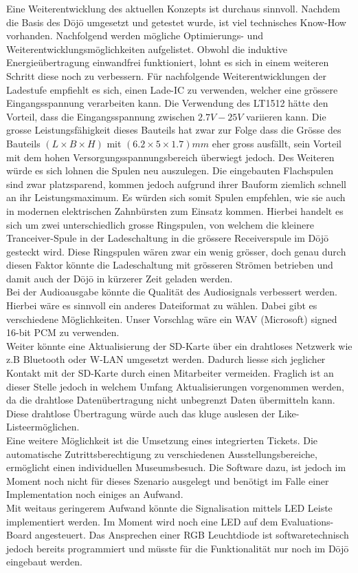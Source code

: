 Eine Weiterentwicklung des aktuellen Konzepts ist durchaus sinnvoll. Nachdem die Basis des Dōjō umgesetzt und getestet wurde, ist viel technisches \glqq Know-How \grqq vorhanden. Nachfolgend werden mögliche Optimierungs- und Weiterentwicklungsmöglichkeiten aufgelistet. 
Obwohl die induktive Energieübertragung einwandfrei funktioniert, lohnt es sich in einem weiteren Schritt diese noch zu verbessern. Für nachfolgende Weiterentwicklungen der Ladestufe empfiehlt es sich, einen Lade-IC zu verwenden, welcher eine grössere Eingangsspannung verarbeiten kann. Die Verwendung des LT1512 hätte den Vorteil, dass die Eingangsspannung zwischen $2.7V - 25V$ variieren kann. Die grosse Leistungsfähigkeit dieses Bauteils hat zwar zur Folge dass die Grösse des Bauteils $(L \times B \times H)$ mit $(6.2\times 5\times 1.7)mm$ eher gross ausfällt, sein Vorteil mit dem hohen Versorgungsspannungsbereich überwiegt jedoch. Des Weiteren würde es sich lohnen die Spulen neu auszulegen. Die eingebauten Flachspulen sind zwar platzsparend, kommen jedoch aufgrund ihrer Bauform ziemlich schnell an ihr Leistungsmaximum. Es würden sich somit Spulen empfehlen, wie sie auch in modernen elektrischen Zahnbürsten zum Einsatz kommen. Hierbei handelt es sich um zwei unterschiedlich grosse Ringspulen, von welchem die kleinere Tranceiver-Spule in der Ladeschaltung in die grössere Receiverspule im Dōjō gesteckt wird. Diese Ringspulen wären zwar ein wenig grösser, doch genau durch diesen Faktor könnte die Ladeschaltung mit grösseren Strömen betrieben und damit auch der Dōjō in kürzerer Zeit geladen werden.\\
Bei der Audioausgabe könnte die Qualität des Audiosignals verbessert werden. Hierbei wäre es sinnvoll ein anderes Dateiformat zu wählen. Dabei gibt es verschiedene Möglichkeiten. Unser Vorschlag wäre ein WAV (Microsoft) signed 16-bit PCM zu verwenden.\\
Weiter könnte eine Aktualisierung der SD-Karte über ein drahtloses Netzwerk wie z.B Bluetooth oder W-LAN umgesetzt werden. Dadurch liesse sich jeglicher Kontakt mit der SD-Karte durch einen Mitarbeiter vermeiden. Fraglich ist an dieser Stelle jedoch in welchem Umfang Aktualisierungen vorgenommen werden, da die drahtlose Datenübertragung nicht unbegrenzt Daten übermitteln kann. Diese drahtlose Übertragung würde auch das kluge auslesen der \glqq Like-Liste\grqq ermöglichen.\\
Eine weitere Möglichkeit ist die Umsetzung eines integrierten Tickets. Die automatische Zutrittsberechtigung zu verschiedenen Ausstellungsbereiche, ermöglicht einen individuellen Museumsbesuch. Die Software dazu, ist jedoch im Moment noch nicht für dieses Szenario ausgelegt und benötigt im Falle einer Implementation noch einiges an Aufwand.\\
Mit weitaus geringerem Aufwand könnte die Signalisation mittels LED Leiste implementiert werden. Im Moment wird noch eine LED auf dem Evaluations-Board angesteuert. Das Ansprechen einer RGB Leuchtdiode ist softwaretechnisch jedoch bereits programmiert und müsste für die Funktionalität nur noch im Dōjō eingebaut werden.